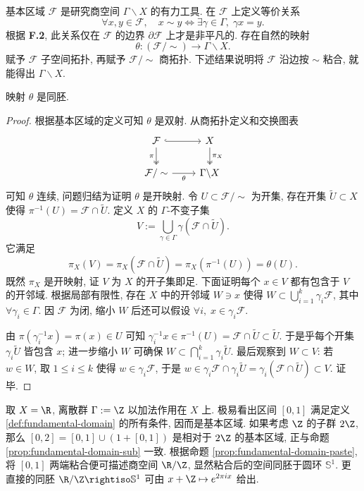 基本区域 $\mathcal{F}$ 是研究商空间 $\Gamma \backslash X$ 的有力工具. 在 $\mathcal{F}$ 上定义等价关系
\[ \forall x,y \in \mathcal{F}, \quad x \sim y \iff \exists \gamma \in \Gamma, \; \gamma x = y. \]
根据 \textbf{F.2}, 此关系仅在 $\mathcal{F}$ 的边界 $\partial \mathcal{F}$ 上才是非平凡的. 存在自然的映射
\[ \theta: (\mathcal{F}/\sim) \longrightarrow \Gamma \backslash X. \]
赋予 $\mathcal{F}$ 子空间拓扑, 再赋予 $\mathcal{F}/\sim$ 商拓扑. 下述结果说明将 $\mathcal{F}$ 沿边按 $\sim$ 粘合, 就能得出 $\Gamma\backslash X$.
\begin{proposition}\label{prop:fundamental-domain-paste}
	映射 $\theta$ 是同胚.
\end{proposition}
\begin{proof}
	根据基本区域的定义可知 $\theta$ 是双射. 从商拓扑定义和交换图表
	\[\begin{tikzcd}
		\mathcal{F} \arrow[d, twoheadrightarrow, "\pi"'] \arrow[r, hookrightarrow] & X \arrow[d, twoheadrightarrow, "\pi_X"] \\
		\mathcal{F}/\sim \arrow[r, "\theta"'] & \Gamma\backslash X
	\end{tikzcd}\]
	可知 $\theta$ 连续, 问题归结为证明 $\theta$ 是开映射. 令 $U \subset \mathcal{F}/\sim$ 为开集, 存在开集 $\tilde{U} \subset X$ 使得 $\pi^{-1}(U) = \mathcal{F} \cap \tilde{U}$. 定义 $X$ 的 $\Gamma$-不变子集
	\[ V := \bigcup_{\gamma \in \Gamma} \gamma (\mathcal{F} \cap \tilde{U}). \]
	它满足
	\[ \pi_X(V) = \pi_X(\mathcal{F} \cap \tilde{U}) = \pi_X(\pi^{-1}(U)) = \theta(U). \]
	既然 $\pi_X$ 是开映射, 证 $V$ 为 $X$ 的开子集即足. 下面证明每个 $x \in V$ 都有包含于 $V$ 的开邻域. 根据局部有限性, 存在 $X$ 中的开邻域 $W \ni x$ 使得 $W \subset \bigcup_{i=1}^k \gamma_i \mathcal{F}$, 其中 $\forall \gamma_i \in \Gamma$. 因 $\mathcal{F}$ 为闭, 缩小 $W$ 后还可以假设 $\forall i, \; x \in \gamma_i\mathcal{F}$.
	
	由 $\pi(\gamma_i^{-1} x) = \pi(x) \in U$ 可知 $\gamma_i^{-1}x \in \pi^{-1}(U) = \mathcal{F} \cap \tilde{U} \subset \tilde{U}$. 于是乎每个开集 $\gamma_i \tilde{U}$ 皆包含 $x$; 进一步缩小 $W$ 可确保 $W \subset \bigcap_{i=1}^k \gamma_i \tilde{U}$. 最后观察到 $W \subset V$: 若 $w \in W$, 取 $1 \leq i \leq k$ 使得 $w \in \gamma_i \mathcal{F}$, 于是 $w \in \gamma_i \mathcal{F} \cap \gamma_i\tilde{U} = \gamma_i(\mathcal{F} \cap \tilde{U}) \subset V$. 证毕.
\end{proof}

\begin{example}
	取 $X = \R$, 离散群 $\Gamma := \Z$ 以加法作用在 $X$ 上. 极易看出区间 $[0,1]$ 满足定义 \ref{def:fundamental-domain} 的所有条件, 因而是基本区域. 如果考虑 $\Z$ 的子群 $2\Z$, 那么 $[0,2] = [0,1] \cup (1 + [0,1])$ 是相对于 $2\Z$ 的基本区域, 正与命题 \ref{prop:fundamental-domain-sub} 一致. 根据命题 \ref{prop:fundamental-domain-paste}, 将 $[0,1]$ 两端粘合便可描述商空间 $\R/\Z$, 显然粘合后的空间同胚于圆环 $\mathbb{S}^1$. 更直接的同胚 $\R/\Z \rightiso \mathbb{S}^1$ 可由 $x + \Z \mapsto e^{2\pi ix}$ 给出.
\end{example}

